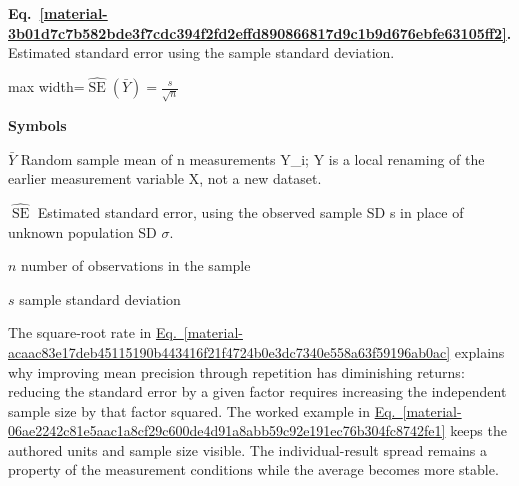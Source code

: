 \documentclass[11pt,a4paper]{article}
\begin{document}
\par\medskip
\noindent\begin{minipage}{\linewidth}
\label{material-3b01d7c7b582bde3f7cdc394f2fd2effd890866817d9c1b9d676ebfe63105ff2}
\noindent\textbf{Eq.~\ref*{material-3b01d7c7b582bde3f7cdc394f2fd2effd890866817d9c1b9d676ebfe63105ff2}.} Estimated standard error using the sample standard deviation.\par\nopagebreak
\begin{center}\begin{adjustbox}{max width=\linewidth}$\displaystyle \widehat{\operatorname{SE}}(\bar Y)=\frac{s}{\sqrt n}$\end{adjustbox}\end{center}

\par\noindent\textbf{Symbols}

\par\noindent\textbf{\(\bar Y\)} Random sample mean of n measurements Y\_i; Y is a local renaming of the earlier measurement variable X, not a new dataset.

\par\noindent\textbf{\(\widehat{\operatorname{SE}}\)} Estimated standard error, using the observed sample SD s in place of unknown population SD \ensuremath{\sigma}.

\par\noindent\textbf{\(n\)} number of observations in the sample

\par\noindent\textbf{\(s\)} sample standard deviation

\end{minipage}\par
\medskip

The square-root rate in \hyperref[material-acaac83e17deb45115190b443416f21f4724b0e3dc7340e558a63f59196ab0ac]{Eq.~\ref*{material-acaac83e17deb45115190b443416f21f4724b0e3dc7340e558a63f59196ab0ac}} explains why improving mean precision through repetition has diminishing returns: reducing the standard error by a given factor requires increasing the independent sample size by that factor squared. The worked example in \hyperref[material-06ae2242c81e5aac1a8cf29c600de4d91a8abb59c92e191ec76b304fc8742fe1]{Eq.~\ref*{material-06ae2242c81e5aac1a8cf29c600de4d91a8abb59c92e191ec76b304fc8742fe1}} keeps the authored units and sample size visible. The individual-result spread remains a property of the measurement conditions while the average becomes more stable.
\end{document}
